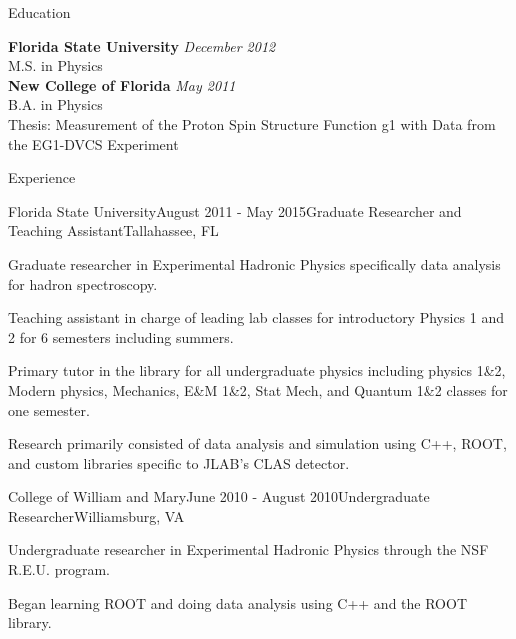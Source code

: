 \documentclass{resume} %
\begin{document}

\begin{rSection}{Education}

{\bf Florida State University} \hfill {\em December 2012} \\ 
M.S. in Physics \\


{\bf New College of Florida} \hfill {\em May 2011} \\ 
B.A. in Physics \\
Thesis: Measurement of the Proton Spin Structure Function g1 with Data from the EG1-DVCS Experiment


\end{rSection}


\begin{rSection}{Experience}

\begin{rSubsection}{Florida State University}{August 2011 -  May 2015}{Graduate Researcher and Teaching Assistant}{Tallahassee, FL}
\item Graduate researcher in Experimental Hadronic Physics specifically data analysis for hadron spectroscopy.
\item Teaching assistant in charge of leading lab classes for introductory Physics 1 and 2 for 6 semesters including summers.
\item Primary tutor in the library for all undergraduate physics including physics 1\&2, Modern physics, Mechanics, E\&M 1\&2, Stat Mech, and Quantum 1\&2 classes for one semester.
\item Research primarily consisted of data analysis and simulation using C++, ROOT, and custom libraries specific to JLAB's CLAS detector.

\end{rSubsection}


\begin{rSubsection}{College of William and Mary}{June 2010 - August 2010}{Undergraduate Researcher}{Williamsburg, VA}
\item Undergraduate researcher in Experimental Hadronic Physics through the NSF R.E.U. program.
\item Began learning ROOT and doing data analysis using C++ and the ROOT library.

\end{rSubsection}

\end{rSection}
\end{document}
